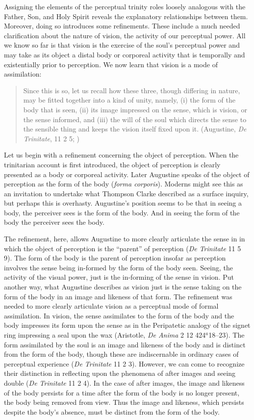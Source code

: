 \documentclass[12pt]{article}
\begin{document}
Assigning the elements of the perceptual trinity roles loosely analogous with the Father, Son, and Holy Spirit reveals the explanatory relationships between them. Moreover, doing so introduces some refinements. These include a much needed clarification about the nature of vision, the activity of our perceptual power. All we know so far is that vision is the exercise of the soul's perceptual power and may take as its object a distal body or corporeal activity that is temporally and existentially prior to perception. We now learn that vision is a mode of assimilation:
\begin{quote}
	Since this is so, let us recall how these three, though differing in nature, may be fitted together into a kind of unity, namely, (i) the form of the body that is seen, (ii) its image impressed on the sense, which is vision, or the sense informed, and (iii) the will of the soul which directs the sense to the sensible thing and keeps the vision itself fixed upon it. (Augustine, \emph{De Trinitate}, 11 2 5; \citealt[65]{Matthews:2002ly})
\end{quote}

Let us begin with a refinement concerning the object of perception. When the trinitarian account is first introduced, the object of perception is clearly presented as a body or corporeal activity. Later Augustine speaks of the object of perception as the form of the body (\emph{forma corporis}). Moderns might see this as an invitation to undertake what Thompson Clarke described as a surface inquiry, but perhaps this is overhasty. Augustine's position seems to be that in seeing a body, the perceiver sees is the form of the body. And in seeing the form of the body the perceiver sees the body. 

The refinement, here, allows Augustine to more clearly articulate the sense in in which the object of perception is the ``parent'' of perception (\emph{De Trinitate} 11 5 9). The form of the body is the parent of perception insofar as perception involves the sense being in-formed by the form of the body seen. Seeing, the activity of the visual power, just is the in-forming of the sense in vision. Put another way, what Augustine describes as vision just is the sense taking on the form of the body in an image and likeness of that form. The refinement was needed to more clearly articulate vision as a perceptual mode of formal assimilation. In vision, the sense assimilates to the form of the body and the body impresses its form upon the sense as in the Peripatetic analogy of the signet ring impressing a seal upon the wax (Aristotle, \emph{De Anima} 2 12 424\( ^{a} \)18–23). The form assimilated by the soul is an image and likeness of the body and is distinct from the form of the body, though these are indiscernable in ordinary cases of perceptual experience (\emph{De Trinitate} 11 2 3). However, we can come to recognize their distinction in reflecting upon the phenomena of after images and seeing double (\emph{De Trinitate} 11 2 4). In the case of after images, the image and likeness of the body persists for a time after the form of the body is no longer present, the body being removed from view. Thus the image and likeness, which persists despite the body's absence, must be distinct from the form of the body.
\end{document}
